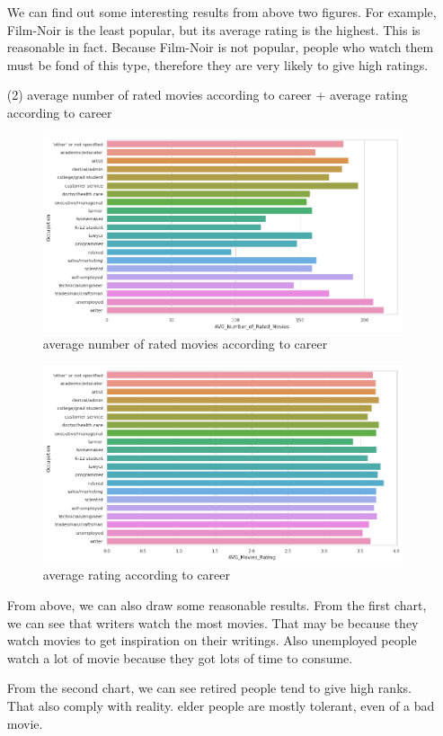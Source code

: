 \documentclass[two column]{article}
\begin{document}
\begin{itemize}
\par We can find out some interesting results from above two figures. For example, Film-Noir is the least popular, but its average rating is the highest. This is reasonable in fact. Because Film-Noir is not popular, people who watch them must be fond of this type, therefore they are very likely to give high ratings.


\item[(2)] average number of rated movies according to career + average rating according to career

\begin{figure}[H]
\centering
\caption{average number of rated movies according to career}
\includegraphics[width = 0.95\linewidth]{career-dis-ave-rated-number-and-ave-rating2.png}
\end{figure}

\begin{figure}[H]
\centering
\caption{average rating according to career}
\includegraphics[width = 0.95\linewidth]{career-dis-ave-rated-number-and-ave-rating3.png}
\end{figure}

\par From above, we can also draw some reasonable results. From the first chart, we can see that writers watch the most movies. That may be because they watch movies to get inspiration on their writings. Also unemployed people watch a lot of movie because they got lots of time to consume. 
\par From the second chart, we can see retired people tend to give high ranks. That also comply with reality. elder people are mostly tolerant, even of a bad movie.



\end{itemize}
\end{document}
